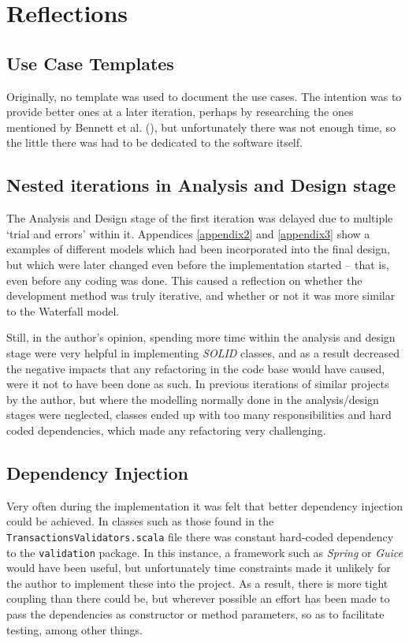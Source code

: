 \section{Reflections} \label{sec:Reflections}

\subsection{Use Case Templates} \label{sec:Reflections.UseCaseTemplates}
Originally, no template was used to document the use cases. The intention was
to provide better ones at a later iteration, perhaps by researching the ones
mentioned by Bennett et al. (\citeyear[][p.~157]{bennett2010object}), but
unfortunately there was not enough time, so the little there was had to be
dedicated to the software itself.

\subsection{Nested iterations in Analysis and Design stage}
The Analysis and Design stage of the first iteration was delayed due to
multiple `trial and errors' within it. Appendices \ref{appendix2} and
\ref{appendix3} show a examples of different models which had been incorporated
into the final design, but which were later changed even before the
implementation started -- that is, even before any coding was done. This caused
a reflection on whether the development method was truly iterative, and whether
or not it was more similar to the Waterfall model.

Still, in the author's opinion, spending more time within the analysis and
design stage were very helpful in implementing \emph{SOLID} classes, and as a
result decreased the negative impacts that any refactoring in the code base
would have caused, were it not to have been done as such. In previous
iterations of similar projects by the author, but where the modelling normally
done in the analysis/design stages were neglected, classes ended up with too
many responsibilities and hard coded dependencies, which made any refactoring
very challenging.

\subsection{Dependency Injection} \label{sec:Reflections.DependencyInjection}
Very often during the implementation it was felt that better dependency
injection could be achieved. In classes such as those found in the
\texttt{TransactionsValidators.scala} file there was constant hard-coded
dependency to the \texttt{validation} package. In this instance, a framework
such as \emph{Spring} or \emph{Guice} would have been useful, but unfortunately
time constraints made it unlikely for the author to implement these into the
project. As a result, there is more tight coupling than there could be, but
wherever possible an effort has been made to pass the dependencies as
constructor or method parameters, so as to facilitate testing, among other
things.

